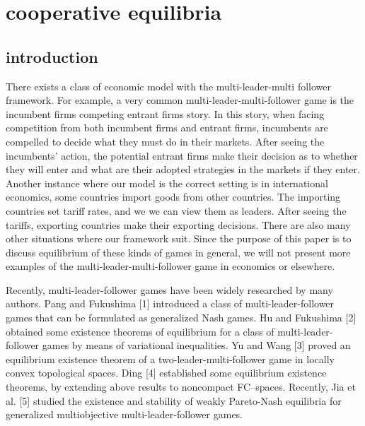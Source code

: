
\chapter{cooperative equilibria}  %

\label{Chapter5} %



\section{introduction}
 
There exists a class of economic model with the multi-leader-multi follower framework.
For example, a very common multi-leader-multi-follower game is the incumbent firms competing entrant firms story. In this story, when facing competition from both incumbent firms
and entrant firms, incumbents are compelled to decide what they must do in their markets. After seeing the incumbents' action, the potential entrant firms make their decision as to
whether they will enter and what are their adopted strategies in the markets if they enter. Another instance where our model is the correct setting is in international economics, some countries
import goods from other countries. The importing countries set tariff rates, and we
we can view them as leaders. After seeing the tariffs, exporting countries make their exporting decisions. There are also many other
situations where our framework suit. Since the purpose of this paper is to discuss equilibrium of these kinds of games in general, we will not present more 
examples of the multi-leader-multi-follower game in economics or elsewhere.


Recently, multi-leader-follower games have been widely researched by many authors.
Pang and Fukushima [1] introduced a class of
multi-leader-follower games that can be formulated as generalized Nash games.
Hu and Fukushima [2] obtained some existence theorems
of equilibrium for a class of multi-leader-follower games by means of
variational inequalities.
Yu and Wang [3]  proved an equilibrium existence theorem of
a two-leader-multi-follower game in locally convex topological spaces.
Ding [4] established some equilibrium existence theorems, by extending above results to noncompact FC--spaces.
Recently, Jia et al. [5] studied the existence and stability of weakly Pareto-Nash
equilibria for generalized multiobjective
multi-leader-follower games.


